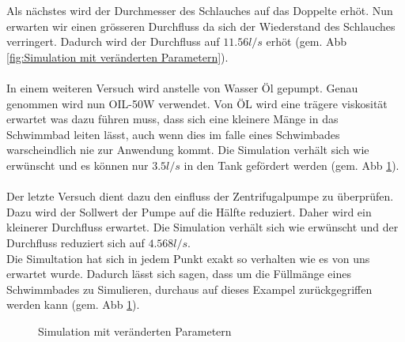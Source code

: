 Als nächstes wird der Durchmesser des Schlauches auf das Doppelte erhöt. Nun erwarten wir einen grösseren Durchfluss da sich der Wiederstand des Schlauches verringert. Dadurch wird der Durchfluss auf $11.56 l/s$ erhöt (gem. Abb \ref{fig:Simulation mit veränderten Parametern}).\\
\\
In einem weiteren Versuch wird anstelle von Wasser Öl gepumpt. Genau genommen wird nun OIL-50W verwendet. Von ÖL wird eine trägere viskosität erwartet was dazu führen muss, dass sich eine kleinere Mänge in das Schwimmbad leiten lässt, auch wenn dies im falle eines Schwimbades warscheindlich nie zur Anwendung kommt. Die Simulation verhält sich wie erwünscht und es können nur $3.5 l/s$ in den Tank gefördert werden (gem. Abb \ref{fig:Simulation mit veränderten Parametern 2}).\\
\\
Der letzte Versuch dient dazu den einfluss der Zentrifugalpumpe zu überprüfen. Dazu wird der Sollwert der Pumpe auf die Hälfte reduziert. Daher wird ein kleinerer Durchfluss erwartet. Die Simulation verhält sich wie erwünscht und der Durchfluss reduziert sich auf $4.568 l/s$.\\
Die Simultation hat sich in jedem Punkt exakt so verhalten wie es von uns erwartet wurde. Dadurch lässt sich sagen, dass um die Füllmänge eines Schwimmbades zu Simulieren, durchaus auf dieses Exampel zurückgegriffen werden kann (gem. Abb \ref{fig:Simulation mit veränderten Parametern 2}).

\begin{figure}[htb]
\caption{Simulation mit veränderten Parametern}
\label{fig:Simulation mit veränderten Parametern 2}
\end{figure}


